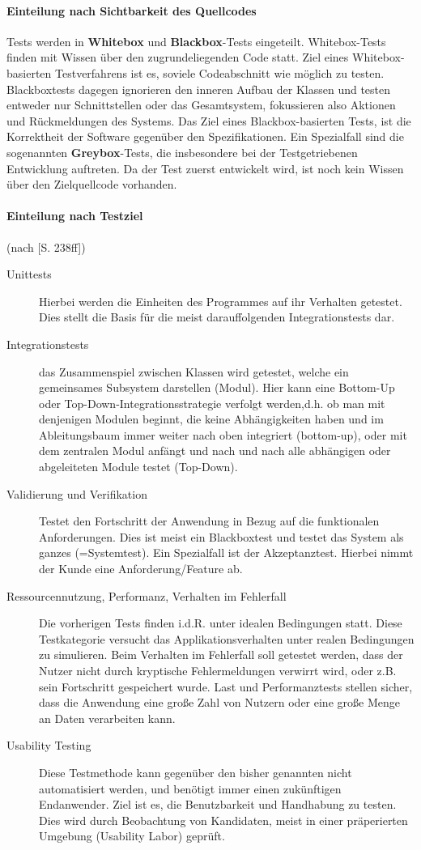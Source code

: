 \paragraph{Einteilung nach Sichtbarkeit des Quellcodes} Tests werden in \textbf{Whitebox} und \textbf{Blackbox}-Tests eingeteilt. 
Whitebox-Tests finden mit Wissen über den zugrundeliegenden Code statt. Ziel eines Whitebox-basierten Testverfahrens ist es, soviele Codeabschnitt wie möglich zu testen. Blackboxtests dagegen ignorieren den inneren Aufbau der Klassen und testen entweder nur Schnittstellen oder das Gesamtsystem, fokussieren also Aktionen und Rückmeldungen des Systems. Das Ziel eines Blackbox-basierten Tests, ist die Korrektheit der Software gegenüber den Spezifikationen.
Ein Spezialfall sind die sogenannten \textbf{Greybox}-Tests, die insbesondere bei der Testgetriebenen Entwicklung auftreten. Da der Test zuerst entwickelt wird, ist noch kein Wissen über den Zielquellcode vorhanden.

\paragraph{Einteilung nach Testziel} (nach \cite{hunt_pragmatic_1999}[S. 238ff])
\begin{description}
 \item[Unittests] Hierbei werden die Einheiten des Programmes auf ihr Verhalten getestet. Dies stellt die Basis für die meist darauffolgenden Integrationstests dar.
 \item[Integrationstests]  das Zusammenspiel zwischen Klassen wird getestet, welche ein gemeinsames Subsystem darstellen (Modul). Hier kann eine Bottom-Up oder Top-Down-Integrationsstrategie verfolgt werden,d.h. ob man mit denjenigen Modulen beginnt, die keine Abhängigkeiten haben und im Ableitungsbaum immer weiter nach oben integriert (bottom-up), oder mit dem zentralen Modul anfängt und nach und nach alle abhängigen oder abgeleiteten Module testet (Top-Down).
 \item[Validierung und Verifikation] Testet den Fortschritt der Anwendung in Bezug auf die funktionalen Anforderungen. Dies ist meist ein Blackboxtest und testet das System als ganzes (=Systemtest). Ein Spezialfall ist der Akzeptanztest. Hierbei nimmt der Kunde eine Anforderung/Feature ab.
 \item[Ressourcennutzung, Performanz, Verhalten im Fehlerfall] Die vorherigen Tests finden i.d.R. unter idealen Bedingungen statt. Diese Testkategorie versucht das Applikationsverhalten unter realen Bedingungen zu simulieren. Beim Verhalten im Fehlerfall soll getestet werden, dass der Nutzer nicht durch kryptische Fehlermeldungen verwirrt wird, oder z.B. sein Fortschritt gespeichert wurde. Last und Performanztests stellen sicher, dass die Anwendung eine große Zahl von Nutzern oder eine große Menge an Daten verarbeiten kann.
 \item[Usability Testing] Diese Testmethode kann gegenüber den bisher genannten nicht automatisiert werden, und benötigt immer einen zukünftigen Endanwender. Ziel ist es, die Benutzbarkeit und Handhabung zu testen. Dies wird durch Beobachtung von Kandidaten, meist in einer präperierten Umgebung (Usability Labor) geprüft.
\end{description}

